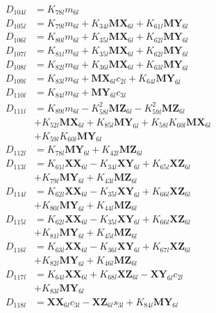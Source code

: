 \begin{multicols}{2}
\begin{align}
D_{104l} &= K_{78l}m_{6l} \nonumber \\
D_{105l} &= K_{79l}m_{6l} + K_{34l}\mathbf{MX}_{6l} + K_{61l}\mathbf{MY}_{6l} \nonumber \\
D_{106l} &= K_{80l}m_{6l} + K_{35l}\mathbf{MX}_{6l} + K_{62l}\mathbf{MY}_{6l} \nonumber \\
D_{107l} &= K_{81l}m_{6l} + K_{35l}\mathbf{MX}_{6l} + K_{62l}\mathbf{MY}_{6l} \nonumber \\
D_{108l} &= K_{82l}m_{6l} + K_{36l}\mathbf{MX}_{6l} + K_{63l}\mathbf{MY}_{6l} \nonumber \\
D_{109l} &= K_{83l}m_{6l} + \mathbf{MX}_{6l}c_{2l} + K_{64l}\mathbf{MY}_{6l} \nonumber \\
D_{110l} &= K_{84l}m_{6l} + \mathbf{MY}_{6l}c_{3l} \nonumber \\
D_{111l} &= K_{89l}m_{6l} - K_{58l}^2\mathbf{MZ}_{6l} - K_{59l}^2\mathbf{MZ}_{6l}  \nonumber \\
&+ K_{52l}\mathbf{MX}_{6l} + K_{85l}\mathbf{MY}_{6l} + K_{58l}K_{60l}\mathbf{MX}_{6l}  \nonumber \\
&+ K_{59l}K_{60l}\mathbf{MY}_{6l} \nonumber \\
D_{112l} &= K_{78l}\mathbf{MY}_{6l} + K_{42l}\mathbf{MZ}_{6l} \nonumber \\
D_{113l} &= K_{61l}\mathbf{XX}_{6l} - K_{34l}\mathbf{XY}_{6l} + K_{65l}\mathbf{XZ}_{6l}  \nonumber \\
&+ K_{79l}\mathbf{MY}_{6l} + K_{43l}\mathbf{MZ}_{6l} \nonumber \\
D_{114l} &= K_{62l}\mathbf{XX}_{6l} - K_{35l}\mathbf{XY}_{6l} + K_{66l}\mathbf{XZ}_{6l}  \nonumber \\
&+ K_{80l}\mathbf{MY}_{6l} + K_{44l}\mathbf{MZ}_{6l} \nonumber \\
D_{115l} &= K_{62l}\mathbf{XX}_{6l} - K_{35l}\mathbf{XY}_{6l} + K_{66l}\mathbf{XZ}_{6l}  \nonumber \\
&+ K_{81l}\mathbf{MY}_{6l} + K_{45l}\mathbf{MZ}_{6l} \nonumber \\
D_{116l} &= K_{63l}\mathbf{XX}_{6l} - K_{36l}\mathbf{XY}_{6l} + K_{67l}\mathbf{XZ}_{6l}  \nonumber \\
&+ K_{82l}\mathbf{MY}_{6l} + K_{46l}\mathbf{MZ}_{6l} \nonumber \\
D_{117l} &= K_{64l}\mathbf{XX}_{6l} + K_{68l}\mathbf{XZ}_{6l} - \mathbf{XY}_{6l}c_{2l}  \nonumber \\
&+ K_{83l}\mathbf{MY}_{6l} \nonumber \\
D_{118l} &= \mathbf{XX}_{6l}c_{3l} - \mathbf{XZ}_{6l}s_{3l} + K_{84l}\mathbf{MY}_{6l} \nonumber \\

\end{align}
\end{multicols}
